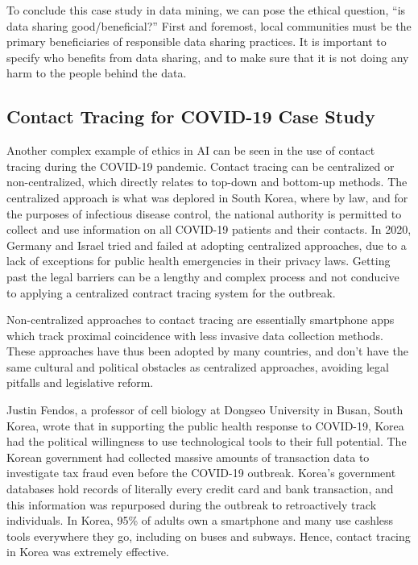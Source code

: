 \documentclass{svproc}
\begin{document}
To conclude this case study in data mining, we can pose the ethical question, “is data sharing good/beneficial?” First and foremost, local communities must be the primary beneficiaries of responsible data sharing practices. \cite{Abebe2021NarrativesAfrica}  It is important to specify who benefits from data sharing, and to make sure that it is not doing any harm to the people behind the data.


\subsection{Contact Tracing for COVID-19 Case Study}

Another complex example of ethics in AI can be seen in the use of contact tracing during the COVID-19 pandemic. Contact tracing can be centralized or non-centralized, which directly relates to top-down and bottom-up methods. The centralized approach is what was deplored in South Korea, where by law, and for the purposes of infectious disease control, the national authority is permitted to collect and use information on all COVID-19 patients and their contacts. \cite{Fendos2020PARTReplicate} In 2020, Germany and Israel tried and failed at adopting centralized approaches, due to a lack of exceptions for public health emergencies in their privacy laws. \cite{Fendos2020PARTReplicate} Getting past the legal barriers can be a lengthy and complex process and not conducive to applying a centralized contract tracing system for the outbreak. \cite{Fendos2020PARTReplicate}

Non-centralized approaches to contact tracing are essentially smartphone apps which track proximal coincidence with less invasive data collection methods. These approaches have thus been adopted by many countries, and don’t have the same cultural and political obstacles as centralized approaches, avoiding legal pitfalls and legislative reform. \cite{Fendos2020PARTReplicate}

Justin Fendos, a professor of cell biology at Dongseo University in Busan, South Korea, wrote that in supporting the public health response to COVID-19, Korea had the political willingness to use technological tools to their full potential. \cite{Fendos2020HowResponse} The Korean government had collected massive amounts of transaction data to investigate tax fraud even before the COVID-19 outbreak. Korea’s government databases hold records of literally every credit card and bank transaction, and this information was repurposed during the outbreak to retroactively track individuals. In Korea, 95\% of adults own a smartphone and many use cashless tools everywhere they go, including on buses and subways. \cite{Fendos2020HowResponse} Hence, contact tracing in Korea was extremely effective.
\end{document}
